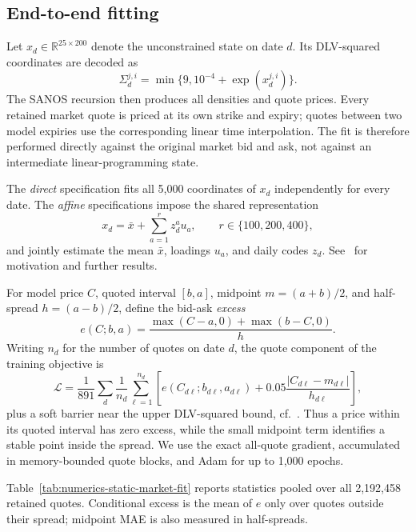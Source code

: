 \documentclass[smallextended,envcountsame,envcountsect]{svjour3}
\newcommand{\abs}[1]{\lvert #1\rvert}
\begin{document}
\subsection{End-to-end fitting}
\label{sec:estimation-fit}

Let $x_d\in\mathbb R^{25\times200}$ denote the unconstrained state on date
$d$. Its DLV-squared coordinates are decoded as
\[
  \Sigma_d^{j,i}=\min\{9,10^{-4}+\exp(x_d^{j,i})\}.
\]
The SANOS recursion then produces all densities and quote prices. Every
retained market quote is priced at its own strike and expiry; quotes between
two model expiries use the corresponding linear time interpolation. The fit is
therefore performed directly against the original market bid and ask, not
against an intermediate linear-programming state.

The \emph{direct} specification fits all 5,000 coordinates of $x_d$
independently for every date. The \emph{affine} specifications impose
the shared representation
\begin{equation}
  \label{eq:estimation-affine-state}
  x_d=\bar x+\sum_{a=1}^r z_d^a u_a,
  \qquad r\in\{100,200,400\},
\end{equation}
and jointly estimate the mean $\bar x$, loadings $u_a$, and daily codes $z_d$. See~\citep{DYSANOS2026}
for motivation and further results.

For model price $C$, quoted interval $[b,a]$, midpoint $m=(a+b)/2$, and
half-spread $h=(a-b)/2$, define the bid-ask \emph{excess}
\begin{equation}\label{eq:excess}
  e(C;b,a)=\frac{\max(C-a,0)+\max(b-C,0)}{h}.
\end{equation}
Writing $n_d$ for the number of quotes on date $d$, the quote component of the
training objective is
\begin{equation}
  \label{eq:estimation-quote-objective}
  \mathcal L
  =\frac1{891}\sum_d\frac1{n_d}\sum_{\ell=1}^{n_d}
    \left[
      e(C_{d\ell};b_{d\ell},a_{d\ell})
      +0.05\frac{\abs{C_{d\ell}-m_{d\ell}}}{h_{d\ell}}
    \right],
\end{equation}
plus a soft barrier near the upper DLV-squared bound, cf.~\citep{DYSANOS2026}. Thus a price within its
quoted interval has zero excess, while the small midpoint term identifies a
stable point inside the spread. We use the exact all-quote gradient, accumulated
in memory-bounded quote blocks, and Adam for up to 1,000 epochs.

Table~\ref{tab:numerics-static-market-fit} reports statistics pooled over all
2,192,458 retained quotes. Conditional excess is the mean of $e$ only over
quotes outside their spread; midpoint MAE is also measured in half-spreads.
\end{document}
